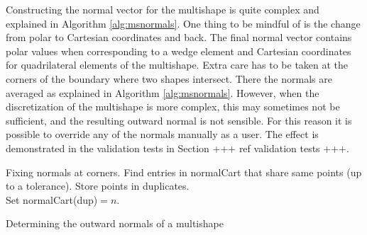 Constructing the normal vector for the multishape is quite complex and explained in Algorithm \ref{alg:msnormals}. One thing to be mindful of is the change from polar to Cartesian coordinates and back. The final normal vector contains polar values when corresponding to a wedge element and Cartesian coordinates for quadrilateral elements of the multishape. Extra care has to be taken at the corners of the boundary where two shapes intersect. There the normals are averaged as explained in Algorithm \ref{alg:msnormals}. However, when the discretization of the multishape is more complex, this may sometimes not be sufficient, and the resulting outward normal is not sensible. For this reason it is possible to override any of the normals manually as a user. The effect is demonstrated in the validation tests in Section +++ ref validation tests +++.
\\
\begin{algorithm}[H]
	\SetAlgoLined
	
	Fixing normals at corners. Find entries in normalCart that share same points (up to a tolerance). Store points in duplicates. \\
	Set normalCart(dup)$ = n $. \\
		
	\caption{Determining the outward normals of a multishape}
	\label{alg:msnormals}
\end{algorithm}



